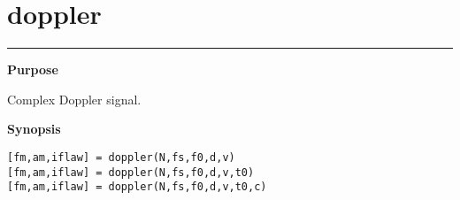 


\section*{\hspace*{-1.6cm} doppler}

\vspace*{-.4cm}
\hspace*{-1.6cm}\rule[0in]{16.5cm}{.02cm}
\vspace*{.2cm}



{\bf \large \sf Purpose}\\
\hspace*{1.5cm}
\begin{minipage}[t]{13.5cm}
Complex Doppler signal.
\end{minipage}
\vspace*{.5cm}


{\bf \large \sf Synopsis}\\
\hspace*{1.5cm}
\begin{minipage}[t]{13.5cm}
\begin{verbatim}
[fm,am,iflaw] = doppler(N,fs,f0,d,v) 
[fm,am,iflaw] = doppler(N,fs,f0,d,v,t0) 
[fm,am,iflaw] = doppler(N,fs,f0,d,v,t0,c) 
\end{verbatim}
\end{minipage}
\vspace*{.5cm}


